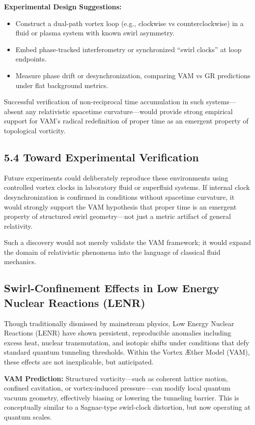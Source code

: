 \textbf{Experimental Design Suggestions:}
\begin{itemize}
    \item Construct a dual-path vortex loop (e.g., clockwise vs counterclockwise) in a fluid or plasma system with known swirl asymmetry.
    \item Embed phase-tracked interferometry or synchronized “swirl clocks” at loop endpoints.
    \item Measure phase drift or desynchronization, comparing VAM vs GR predictions under flat background metrics.
\end{itemize}

Successful verification of non-reciprocal time accumulation in such systems---absent any relativistic spacetime curvature---would provide strong empirical support for VAM's radical redefinition of proper time as an emergent property of topological vorticity.


\subsection*{5.4 Toward Experimental Verification}

Future experiments could deliberately reproduce these environments using controlled vortex clocks in laboratory fluid or superfluid systems. If internal clock desynchronization is confirmed in conditions without spacetime curvature, it would strongly support the VAM hypothesis that proper time is an emergent property of structured swirl geometry---not just a metric artifact of general relativity.


Such a discovery would not merely validate the VAM framework; it would expand the domain of relativistic phenomena into the language of classical fluid mechanics.

\subsection{Swirl-Confinement Effects in Low Energy Nuclear Reactions (LENR)}

Though traditionally dismissed by mainstream physics, Low Energy Nuclear Reactions (LENR) have shown persistent, reproducible anomalies including excess heat, nuclear transmutation, and isotopic shifts under conditions that defy standard quantum tunneling thresholds. Within the Vortex Æther Model (VAM), these effects are not inexplicable, but anticipated.

\textbf{VAM Prediction:} Structured vorticity---such as coherent lattice motion, confined cavitation, or vortex-induced pressure---can modify local quantum vacuum geometry, effectively biasing or lowering the tunneling barrier. This is conceptually similar to a Sagnac-type swirl-clock distortion, but now operating at quantum scales.

